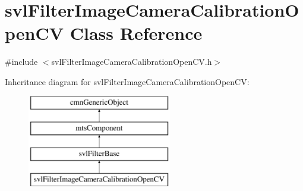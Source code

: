 \hypertarget{classsvl_filter_image_camera_calibration_open_c_v}{}\section{svl\+Filter\+Image\+Camera\+Calibration\+Open\+C\+V Class Reference}
\label{classsvl_filter_image_camera_calibration_open_c_v}


{\ttfamily \#include $<$svl\+Filter\+Image\+Camera\+Calibration\+Open\+C\+V.\+h$>$}

Inheritance diagram for svl\+Filter\+Image\+Camera\+Calibration\+Open\+C\+V\+:\begin{figure}[H]
\begin{center}
\leavevmode
\includegraphics[height=4.000000cm]{d1/dc5/classsvl_filter_image_camera_calibration_open_c_v}
\end{center}
\end{figure}
